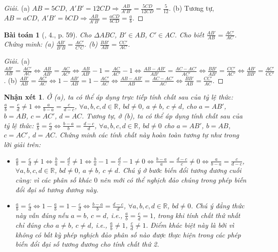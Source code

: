 \documentclass{article}
\newtheorem{baitoan}{Bài toán}
\newtheorem{nhanxet}{Nhận xét}
\begin{document}
\begin{proof}[Giải]
	(a) $AB = 5CD$, $A'B' = 12CD\Rightarrow\frac{AB}{A'B'} = \frac{5CD}{12CD} = \frac{5}{12}$. (b) Tương tự, $AB = aCD$, $A'B' = bCD\Rightarrow\frac{AB}{A'B'} = \frac{aCD}{bCD} = \frac{a}{b}$.
\end{proof}

\begin{baitoan}[\cite{SGK_Toan_8_tap_2}, 4., p. 59]
	Cho $\Delta ABC$, $B'\in AB$, $C'\in AC$. Cho biết $\frac{AB'}{AB} = \frac{AC'}{AC}$. Chứng minh: (a) $\frac{AB'}{B'B} = \frac{AC'}{C'C}$. (b) $\frac{BB'}{AB} = \frac{CC'}{AC}$.
\end{baitoan}

\begin{proof}[Giải]
	(a) $\frac{AB'}{AB} = \frac{AC'}{AC}\Leftrightarrow\frac{AB}{AB'} = \frac{AC}{AC'}\Leftrightarrow\frac{AB}{AB'} - 1 = \frac{AC}{AC'} - 1\Leftrightarrow\frac{AB - AB'}{AB'} = \frac{AC - AC'}{AC'}\Leftrightarrow\frac{BB'}{AB'} = \frac{CC'}{AC'}\Leftrightarrow\frac{AB'}{BB'} = \frac{AC'}{CC'}$. (b) $\frac{AB'}{AB} = \frac{AC'}{AC}\Leftrightarrow1 - \frac{AB'}{AB} = 1 - \frac{AC'}{AC}\Leftrightarrow\frac{AB - AB'}{AB} = \frac{AC - AC'}{AC}\Leftrightarrow\frac{BB'}{AB} = \frac{CC'}{AC}$.
\end{proof}

\begin{nhanxet}
	Ở (a), ta có thể áp dụng trực tiếp tính chất sau của tỷ lệ thức: $\frac{a}{b} = \frac{c}{d}\ne1\Leftrightarrow\frac{a}{b - a} = \frac{c}{d - c}$, $\forall a,b,c,d\in\mathbb{R}$, $bd\ne0$, $a\ne b$, $c\ne d$, cho $a = AB'$, $b = AB$, $c = AC'$, $d = AC$. Tương tự, ở (b), ta có thể áp dụng tính chất sau của tỷ lệ thức: $\frac{a}{b} = \frac{c}{d}\Leftrightarrow\frac{b - a}{b} = \frac{d - c}{d}$, $\forall a,b,c,d\in\mathbb{R}$, $bd\ne0$ cho $a = AB'$, $b = AB$, $c = AC'$, $d = AC$. Chứng minh các tính chất này hoàn toàn tương tự như trong lời giải trên:
	\begin{itemize}
		\item $\frac{a}{b} = \frac{c}{d}\ne1\Leftrightarrow\frac{b}{a} = \frac{d}{c}\ne1\Leftrightarrow\frac{b}{a} - 1 = \frac{d}{c} - 1\ne0\Leftrightarrow\frac{b - a}{a} = \frac{d - c}{c}\ne0\Leftrightarrow\frac{a}{b - a} = \frac{c}{d - c}$, $\forall a,b,c,d\in\mathbb{R}$, $bd\ne0$, $a\ne b$, $c\ne d$. Chú ý ở bước biến đổi tương đương cuối cùng: vì các phân số khác $0$ nên mới có thể nghịch đảo chúng trong phép biến đổi đại số tương đương này.
		\item $\frac{a}{b} = \frac{c}{d}\Leftrightarrow1 - \frac{a}{b} = 1 - \frac{c}{d}\Leftrightarrow\frac{b - a}{b} = \frac{d - c}{d}$, $\forall a,b,c,d\in\mathbb{R}$, $bd\ne0$. Chú ý đẳng thức này vẫn đúng nếu $a = b$, $c = d$, i.e., $\frac{a}{b} = \frac{c}{d} = 1$, trong khi tính chất thứ nhất chỉ đúng cho $a\ne b$, $c\ne d$, i.e., $\frac{a}{b}\ne1$, $\frac{c}{d}\ne1$. Điểm khác biệt này là bởi vì không có bất kỳ phép nghịch đảo phân số nào được thực hiện trong các phép biến đổi đại số tương đương cho tính chất thứ 2.
	\end{itemize} 
\end{nhanxet}
\end{document}
